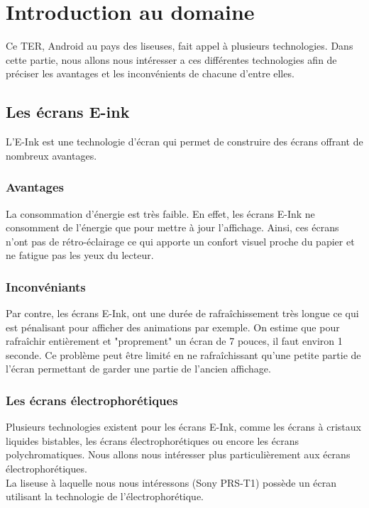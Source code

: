 \chapter{Introduction au domaine}
Ce TER, Android au pays des liseuses, fait appel à plusieurs technologies. Dans cette partie, nous allons nous intéresser a ces différentes technologies afin de préciser les avantages et les inconvénients de chacune d'entre elles.

\section{Les écrans E-ink}
L'E-Ink est une technologie d'écran qui permet de construire des écrans offrant de nombreux avantages.

\subsection{Avantages}
La consommation d'énergie est très faible. En effet, les écrans E-Ink ne consomment de l'énergie que pour mettre à jour l'affichage. Ainsi, ces écrans n'ont pas de rétro-éclairage ce qui apporte un confort visuel proche du papier et ne fatigue pas les yeux du lecteur. 

\subsection{Inconvéniants}
Par contre, les écrans E-Ink, ont une durée de rafraîchissement très longue ce qui est pénalisant pour afficher des animations par exemple. On estime que pour rafraîchir entièrement et "proprement" un écran de 7 pouces, il faut environ 1 seconde. Ce problème peut être limité en ne rafraîchissant qu'une petite partie de l'écran permettant de garder une partie de l'ancien affichage. 

\subsection{Les écrans électrophorétiques}
Plusieurs technologies existent pour les écrans E-Ink, comme les écrans à cristaux liquides bistables, les écrans électrophorétiques ou encore les écrans polychromatiques. Nous allons nous intéresser plus particulièrement aux écrans électrophorétiques.\\

La liseuse à laquelle nous nous intéressons (Sony PRS-T1) possède un écran utilisant la technologie de l'électrophorétique.


